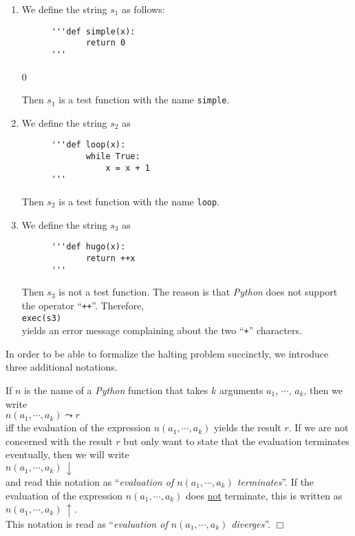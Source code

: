 \examplesEng
\begin{enumerate}
\item We define the string $s_1$ as follows:
      \begin{verbatim}
      '''def simple(x): 
             return 0
      '''
      \end{verbatim}
0      \vspace*{-0.8cm}

      Then $s_1$ is a test function with the name \texttt{simple}.
\item We define the string $s_2$ as
      \begin{verbatim}
      '''def loop(x): 
             while True: 
                 x = x + 1
      '''
      \end{verbatim}
      \vspace*{-0.8cm}

      Then $s_2$ is a test function with the name \texttt{loop}. 
\item We define the string $s_3$ as
      \begin{verbatim}
      '''def hugo(x):
             return ++x
      '''
      \end{verbatim}
      \vspace*{-0.8cm}

      Then $s_3$ is not a test function.  The reason is that \textsl{Python} does not support the operator
      ``\texttt{++}''.  Therefore, 
      \\[0.2cm]
      \hspace*{1.3cm}
      \texttt{exec(s3)}
      \\[0.2cm]
      yields an error message complaining about the two ``\texttt{+}'' characters.
\end{enumerate}
In order to be able to formalize the halting problem succinctly, we introduce three additional
notations.

\begin{Notation}[$\leadsto$, $\downarrow$, $\uparrow$]
If $n$ is the name of a \textsl{Python} function that takes $k$ arguments $a_1$, $\cdots$, $a_k$,
then we write 
\\[0.2cm]
\hspace*{1.3cm}
 $n(a_1, \cdots, a_k) \leadsto r$ 
\\[0.2cm]
iff the evaluation of the expression $n(a_1, \cdots, a_k)$ yields the result $r$.  If we are not
concerned with the result $r$ but only want to state that the evaluation terminates eventually,
then we will write
\\[0.2cm]
\hspace*{1.3cm} $n(a_1, \cdots, a_k) \,\downarrow$ \\[0.3cm]
and read this notation as ``\emph{evaluation of $n(a_1, \cdots, a_k)$ terminates}''.
If the evaluation of the expression $n(a_1, \cdots, a_k)$ does \underline{not} terminate, this is
written as \\[0.2cm]
\hspace*{1.3cm}
 $n(a_1, \cdots, a_k) \,\uparrow$. 
\\[0.2cm]
This notation is read as ``\emph{evaluation of $n(a_1, \cdots, a_k)$ diverges}''.
\hspace*{\fill} $\Box$
\end{Notation}

